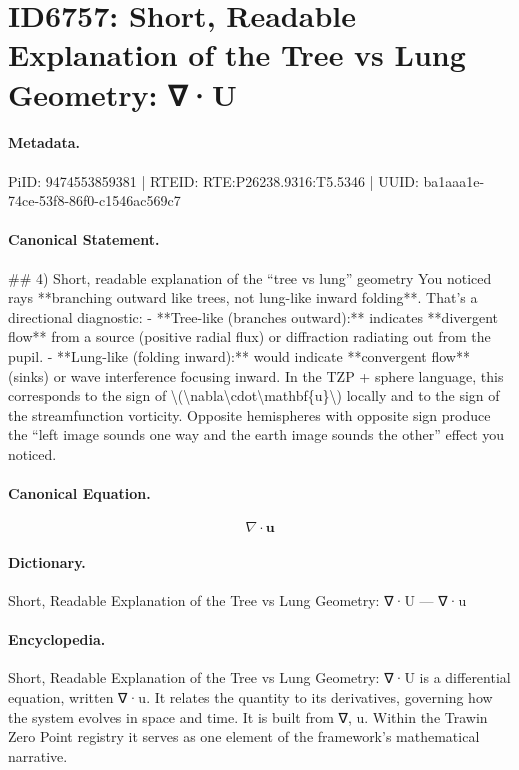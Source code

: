 \section*{ID6757: Short, Readable Explanation of the Tree vs Lung Geometry: ∇·U}
\paragraph{Metadata.}
PiID: 9474553859381 | RTEID: RTE:P26238.9316:T5.5346 | UUID: ba1aaa1e-74ce-53f8-86f0-c1546ac569c7

\paragraph{Canonical Statement.}
\#\# 4) Short, readable explanation of the “tree vs lung” geometry You noticed rays **branching outward like trees, not lung-like inward folding**. That’s a directional diagnostic: - **Tree-like (branches outward):** indicates **divergent flow** from a source (positive radial flux) or diffraction radiating out from the pupil. - **Lung-like (folding inward):** would indicate **convergent flow** (sinks) or wave interference focusing inward. In the TZP + sphere language, this corresponds to the sign of \textbackslash{}(\textbackslash{}nabla\textbackslash{}cdot\textbackslash{}mathbf\{u\}\textbackslash{}) locally and to the sign of the streamfunction vorticity. Opposite hemispheres with opposite sign produce the “left image sounds one way and the earth image sounds the other” effect you noticed.

\paragraph{Canonical Equation.}
\[
\nabla\cdot\mathbf{u}
\]

\paragraph{Dictionary.}
Short, Readable Explanation of the Tree vs Lung Geometry: ∇·U — ∇·u

\paragraph{Encyclopedia.}
Short, Readable Explanation of the Tree vs Lung Geometry: ∇·U is a differential equation, written ∇·u. It relates the quantity to its derivatives, governing how the system evolves in space and time. It is built from ∇, u. Within the Trawin Zero Point registry it serves as one element of the framework's mathematical narrative.

